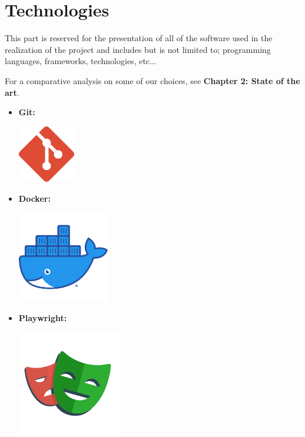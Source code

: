 \newpage

\section{Technologies}
This part is reserved for the presentation of all of the software used in the realization of the project and includes but is not limited to; programming languages, frameworks, technologies, etc...

\medskip
For a comparative analysis on some of our choices, see \textbf {Chapter 2: State of the art}.

\begin{itemize}
    \item \textbf{Git:} \newline
          \begin{minipage}{\linewidth}
              \centering
              \includegraphics[width=2.5cm]{src/assets/logos/git_512x512.png}
          \end{minipage}
    \item \textbf{Docker:} \newline
          \begin{minipage}{\linewidth}
              \centering
              \includegraphics[width=4cm]{src/assets/logos/docker_512x512.png}
          \end{minipage}
    \item \textbf{Playwright:} \newline
          \begin{minipage}{\linewidth}
              \centering
              \includegraphics[width=4.5cm]{src/assets/logos/playwright_512x512.png}
          \end{minipage}


\end{itemize}
